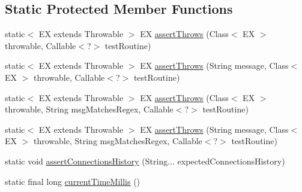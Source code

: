 \subsection*{Static Protected Member Functions}
\begin{DoxyCompactItemize}
\item 
static$<$ EX extends Throwable $>$ EX \mbox{\hyperlink{classtestsuite_1_1_base_test_case_ae34ffd921f16370341c4e642181840da}{assert\+Throws}} (Class$<$ EX $>$ throwable, Callable$<$?$>$ test\+Routine)
\item 
static$<$ EX extends Throwable $>$ EX \mbox{\hyperlink{classtestsuite_1_1_base_test_case_aeb8b95d92ca70c6308fbf4f5bf701286}{assert\+Throws}} (String message, Class$<$ EX $>$ throwable, Callable$<$?$>$ test\+Routine)
\item 
static$<$ EX extends Throwable $>$ EX \mbox{\hyperlink{classtestsuite_1_1_base_test_case_a4374e9b5e46f33c84aefeb7d5d7e49d5}{assert\+Throws}} (Class$<$ EX $>$ throwable, String msg\+Matches\+Regex, Callable$<$?$>$ test\+Routine)
\item 
static$<$ EX extends Throwable $>$ EX \mbox{\hyperlink{classtestsuite_1_1_base_test_case_a933e368e79298cfda4960166ec2b078c}{assert\+Throws}} (String message, Class$<$ EX $>$ throwable, String msg\+Matches\+Regex, Callable$<$?$>$ test\+Routine)
\item 
static void \mbox{\hyperlink{classtestsuite_1_1_base_test_case_aca5533ef294301b97ad9d54a7edf825f}{assert\+Connections\+History}} (String... expected\+Connections\+History)
\item 
static final long \mbox{\hyperlink{classtestsuite_1_1_base_test_case_a48d748cca7b09172b6e5e2fac15c6bc7}{current\+Time\+Millis}} ()
\end{DoxyCompactItemize}

